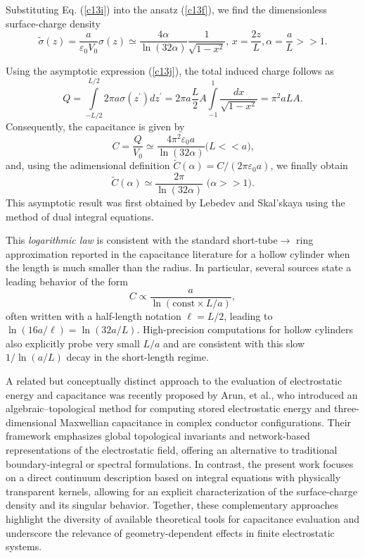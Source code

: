 \documentclass[12pt]{article}
\begin{document}
Substituting Eq. (\ref{c13i}) into the ansatz (\ref{c13f}), we find the
dimensionless surface-charge density
\begin{equation}
\widetilde{\sigma}(z)=\frac{a}{\varepsilon_{0}V_{0}}\sigma(z)\simeq
\frac{4\alpha}{\ln(32\alpha)}\frac{1}{\sqrt{1-x^{2}}}\text{, }x=\frac{2z}%
{L},\alpha=\frac{a}{L}>>1. \label{c13j}%
\end{equation}

Using the asymptotic expression (\ref{c13j}), the total induced charge follows
as%
\begin{equation}
Q=\int\limits_{-L/2}^{L/2}2\pi a\sigma(z^{\prime})dz^{\prime}=2\pi
a\frac{L}{2}A\int\limits_{-1}^{1}\frac{dx}{\sqrt{1-x^{2}}}=\pi^{2}aLA.
\label{c13l}%
\end{equation}
Consequently, the capacitance is given by%
\begin{equation}
C=\frac{Q}{V_{0}}\simeq\frac{4\pi^{2}\varepsilon_{0}a}{\ln(32\alpha)}\text{
(}L<<a\text{),} \label{c13m}%
\end{equation}
and, using the adimensional definition $\widetilde{C}(\alpha)=C/(2\pi
\varepsilon_{0}a)$, we finally obtain%
\begin{equation}
\widetilde{C}(\alpha)\simeq\frac{2\pi}{\ln(32\alpha)}\text{ (}\alpha
>>1\text{).} \label{c13n}%
\end{equation}
This asymptotic result was first obtained by Lebedev and Skal'skaya\cite{exp1}
using the method of dual integral equations.

This \textit{logarithmic law} is consistent with the standard
short-tube$\rightarrow$ ring approximation reported in the capacitance
literature for a hollow cylinder when the length is much smaller than the
radius. In particular, several sources state a leading behavior of the form%
\begin{equation}
C\propto\frac{a}{\ln\left(  \text{const}\times L/a\right)  }, \label{c13o}%
\end{equation}
often written with a half-length notation $\ell=L/2$, leading to $\ln
(16a/\ell)=\ln(32a/L)$\cite{exp1}. High-precision computations for hollow
cylinders also explicitly probe very small $L/a$ and are consistent with this
slow $1/\ln(a/L)$ decay in the short-length
regime\cite{exp2,exp3,exp4,exp5,exp6,exp7}.

A related but conceptually distinct approach to the evaluation of
electrostatic energy and capacitance was recently proposed by Arun, et
al.\cite{exp8}, who introduced an algebraic--topological method for computing
stored electrostatic energy and three-dimensional Maxwellian capacitance in
complex conductor configurations. Their framework emphasizes global
topological invariants and network-based representations of the electrostatic
field, offering an alternative to traditional boundary-integral or spectral
formulations. In contrast, the present work focuses on a direct continuum
description based on integral equations with physically transparent kernels,
allowing for an explicit characterization of the surface-charge density and
its singular behavior. Together, these complementary approaches highlight the
diversity of available theoretical tools for capacitance evaluation and
underscore the relevance of geometry-dependent effects in finite electrostatic systems.
\end{document}
